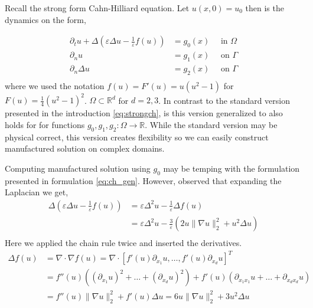 Recall the strong form Cahn-Hilliard equation. Let $ u( x,0) =  u_{0}$ then is the dynamics on the form,

\begin{equation}
\label{eq:ch_gen}
    \begin{split}
\partial _{t} u + \Delta  \left(  \varepsilon  \Delta u - \frac{1}{\varepsilon }f( u) \right)   &= g_{0}( x)   \quad \text{ in } \Omega  \\
\partial _{n} u &= g_{1}( x)  \quad \text{ on } \Gamma  \\
\partial _{n}    \Delta u   &= g_{2}(x)  \quad \text{ on } \Gamma  \\
    \end{split}
\end{equation}
where we used the notation $f( u) = F'( u) =u( u^2 -1)  $ for $F( u) = \frac{1}{4}( u^{2} - 1)^{2} $. $\Omega \subset \mathbb{R} ^{d} $  for $d = 2,3$. In contrast to the standard version presented in the introduction \eqref{eq:strongch}, is this version
generalized to also holds for for functions $g_{0},g_{1},g_{2}: \Omega \to\mathbb{R}   $. While the standard version may be physical correct, this version creates flexibility so we can easily construct manufactured solution on complex domains.

\begin{remark}
    Computing manufactured solution using $g_{0}$ may be temping with the formulation presented in formulation \eqref{eq:ch_gen}. However, observed that expanding the Laplacian we get,
\[
    \begin{split}
        \Delta  \left(  \varepsilon  \Delta u - \frac{1}{\varepsilon }f( u) \right) & = \varepsilon \Delta^2 u - \frac{1}{\varepsilon } \Delta f( u) \\
                                                                                    &= \varepsilon \Delta ^2 u  - \frac{3}{\varepsilon }( 2u \| \nabla u \|_{ 2 }^{ 2 } + u^{2}  \Delta u )   \\
    \end{split}
\]
Here we applied the chain rule twice and inserted the derivatives.
\[
    \begin{split}
\Delta f( u)  &= \nabla \cdot \nabla f( u)  = \nabla \cdot  \left[ f' ( u) \partial _{x_{1}}u, \ldots, f' ( u) \partial _{x_{d}}u \right] ^{T} \\
& =  f'' ( u)( ( \partial _{x_{1}}u )^{2} + \ldots +( \partial _{x_{d}}u )^{2} ) +  f' ( u)( \partial _{x_{1} x_{1}}u + \ldots +   \partial _{x_{d} x_{d}}u ) \\
&=  f'' ( u) \| \nabla u \|_{ 2 }^{ 2 } + f' ( u)  \Delta u  = 6u \| \nabla u \|_{ 2 }^{ 2 } + 3u^{2}  \Delta u
    \end{split}
\]
\end{remark}

